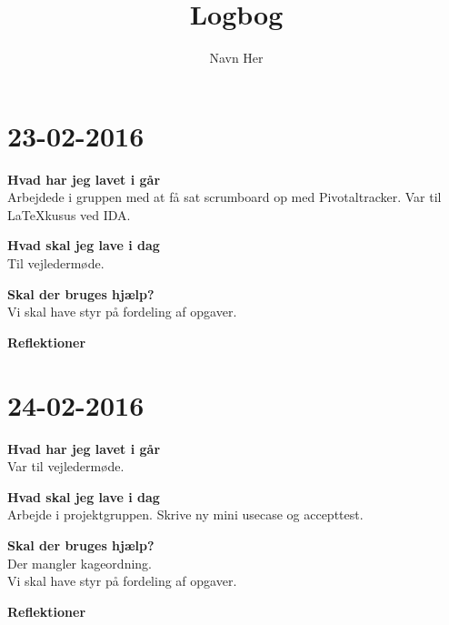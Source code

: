 \documentclass{article}
\title{Logbog}
\author{Navn Her}
\date{}
\begin{document}
	\maketitle
	\tableofcontents
	
	\section{23-02-2016}
	
	\textbf{Hvad har jeg lavet i går}\\
	Arbejdede i gruppen med at få sat scrumboard op med Pivotaltracker.
	Var til LaTeXkusus ved IDA.
	
	\textbf{Hvad skal jeg lave i dag}\\
	Til vejledermøde. 
	
	\textbf{Skal der bruges hjælp?}\\
	Vi skal have styr på fordeling af opgaver.
	
	\textbf{Reflektioner}\\
	
		\section{24-02-2016}
		
		\textbf{Hvad har jeg lavet i går}\\
		Var til vejledermøde.
		
		\textbf{Hvad skal jeg lave i dag}\\
		Arbejde i projektgruppen. Skrive ny mini usecase og accepttest. 
		
		\textbf{Skal der bruges hjælp?}\\
		Der mangler kageordning.\\
		Vi skal have styr på fordeling af opgaver.
		
		
		\textbf{Reflektioner}
\end{document}
